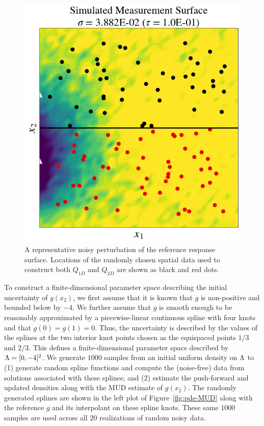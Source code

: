 \begin{figure}[htbp]
\centering
\includegraphics[width=0.65\linewidth]{figures/pde-highd/pde-highd_sensors_D2.png}
\caption{
A representative noisy perturbation of the reference response surface. Locations of the randomly chosen spatial data used to construct both $Q_{1D}$ and $Q_{2D}$ are shown as black and red dots.
}
\label{fig:pde-Q}
\end{figure}

To construct a finite-dimensional parameter space describing the initial uncertainty of $g(x_2)$, we first assume that it is known that $g$ is non-positive and bounded below by $-4$.
We further assume that $g$ is smooth enough to be reasonably approximated by a piecewise-linear continuous spline with four knots and that $g(0)=g(1)=0$.
Thus, the uncertainty is described by the values of the splines at the two interior knot points chosen as the equispaced points $1/3$ and $2/3$.
This defines a finite-dimensional parameter space described by ${\Lambda} = [0,-4]^2$.
We generate $1000$ samples from an initial uniform density on ${\Lambda}$ to (1) generate random spline functions and compute the (noise-free) data from solutions associated with these splines; and (2) estimate the push-forward and updated densities along with the MUD estimate of $g(x_2)$.
The randomly generated splines are shown in the left plot of Figure~\ref{fig:pde-MUD} along with the reference $g$ and its interpolant on these spline knots.
These same $1000$ samples are used across all $20$ realizations of random noisy data.



